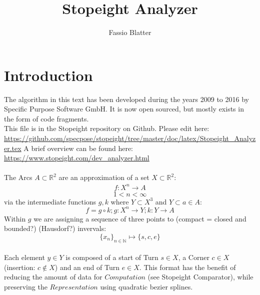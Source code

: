 \documentclass{article}
\begin{document}
\title{Stopeight Analyzer}
\author{Fassio Blatter}
\maketitle

\section{Introduction}

The algorithm in this text has been developed during the years 2009 to 2016 by Specific Purpose Software GmbH. It is now open sourced, but mostly exists in the form of code fragments.\\
This file is in the Stopeight repository on Github. Please edit here:\\
\href{https://github.com/specpose/stopeight/tree/master/doc/latex/Stopeight_Analyzer.tex}{https://github.com/specpose/stopeight/tree/master/doc/latex/Stopeight\_Analyzer.tex}
A brief overview can be found here:\\
\href{https://www.stopeight.com/dev_analyzer.html}{https://www.stopeight.com/dev\_analyzer.html}\\\\
The Arcs $A \subset \mathbb{R}^2$ are an approximation of a set $X \subset \mathbb{R}^2$:
\begin{align}
f: X^n \rightarrow A
\end{align}
\begin{equation*}
1 < n < \infty
\end{equation*}
via the intermediate functions $g,k$ where $Y \subset X^3$ and $Y \subset a \in A$:
\begin{equation}
f = g \circ k; g: X^n \rightarrow Y; k: Y \rightarrow A
\end{equation}
\begin{equation*}
\end{equation*}
Within $g$ we are assigning a sequence of three points to (compact = closed and bounded?) (Hausdorf?) invervals:
\begin{equation}
\{x_{n}\}_{n \in \mathbb{N}} \mapsto \{s,c,e\}
\end{equation}\\
Each element $y \in Y$ is composed of a start of Turn $s \in X$, a Corner $c \in X$ (insertion: $c \notin X$) and an end of Turn $e \in X$. This format has the benefit of reducing the amount of data for $Computation$ (see Stopeight Comparator), while preserving the $Representation$ using quadratic bezier splines.
\end{document}
